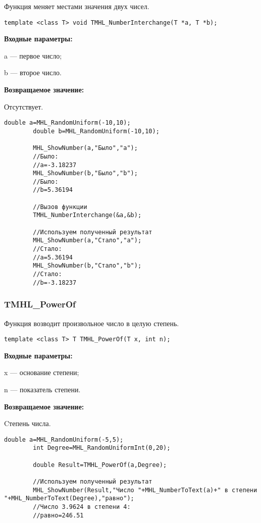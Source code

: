\documentclass[a4paper,12pt]{article}
\begin{document}
Функция меняет местами значения двух чисел.


\begin{lstlisting}[label=code_syntax_TMHL_NumberInterchange,caption=Синтаксис]
template <class T> void TMHL_NumberInterchange(T *a, T *b);
\end{lstlisting}

\textbf{Входные параметры:}

 a --- первое число;
 
 b --- второе число.

\textbf{Возвращаемое значение:}

 Отсутствует.


\begin{lstlisting}[label=code_use_TMHL_NumberInterchange,caption=Пример использования]
        double a=MHL_RandomUniform(-10,10);
        double b=MHL_RandomUniform(-10,10);

        MHL_ShowNumber(a,"Было","a");
        //Было:
        //a=-3.18237
        MHL_ShowNumber(b,"Было","b");
        //Было:
        //b=5.36194

        //Вызов функции
        TMHL_NumberInterchange(&a,&b);

        //Используем полученный результат
        MHL_ShowNumber(a,"Стало","a");
        //Стало:
        //a=5.36194
        MHL_ShowNumber(b,"Стало","b");
        //Стало:
        //b=-3.18237
\end{lstlisting}

\subsubsection{TMHL\_PowerOf}\label{TMHL_PowerOf}

Функция возводит произвольное число в целую степень.


\begin{lstlisting}[label=code_syntax_TMHL_PowerOf,caption=Синтаксис]
template <class T> T TMHL_PowerOf(T x, int n);
\end{lstlisting}

\textbf{Входные параметры:}  
 
x --- основание степени;
 
n --- показатель степени.

\textbf{Возвращаемое значение:}

Cтепень числа.


\begin{lstlisting}[label=code_use_TMHL_PowerOf,caption=Пример использования]
        double a=MHL_RandomUniform(-5,5);
        int Degree=MHL_RandomUniformInt(0,20);

        double Result=TMHL_PowerOf(a,Degree);

        //Используем полученный результат
        MHL_ShowNumber(Result,"Число "+MHL_NumberToText(a)+" в степени "+MHL_NumberToText(Degree),"равно");
        //Число 3.9624 в степени 4:
        //равно=246.51
\end{lstlisting}
\end{document}
